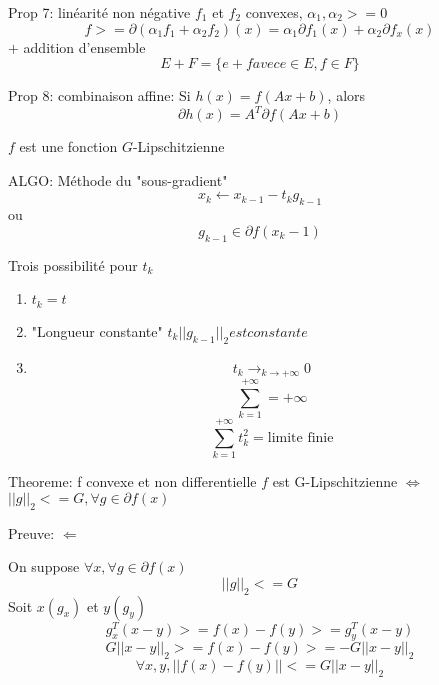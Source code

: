 \documentclass{article}
\begin{document}
Prop 7: lin\'earit\'e non n\'egative
$f_1$ et $f_2$ convexes, $\alpha_1,\alpha_2>=0$
\begin{equation}
f>=\partial(\alpha_1 f_1+\alpha_2 f_2)(x)=\alpha_1 \partial f_1(x)+\alpha_2 \partial f_x(x)
\end{equation}
$+$ addition d'ensemble
\begin{equation}
E+F=\{e+f avec e\in E,f\in F\}
\end{equation}

Prop 8: combinaison affine:
Si $h(x)=f(Ax+b)$, alors
\begin{equation}
\partial h(x)=A^T\partial f(Ax+b)
\end{equation}

$f$ est une fonction $G$-Lipschitzienne

ALGO: M\'ethode du "sous-gradient"
\begin{equation}
x_k\leftarrow x_{k-1}-t_k g_{k-1}
\end{equation}
ou
\begin{equation}
g_{k-1}\in\partial f(x_k-1)
\end{equation}

Trois possibilit\'e pour $t_k$
\begin{enumerate}
\item $t_k=t$
\item "Longueur constante" $t_k||g_{k-1}||_2 est constante$
\item 
\begin{equation}
t_k\to_{k\to +\infty} 0
\end{equation}
\begin{equation}
\sum_{k=1}^{+\infty}=+\infty
\end{equation}
\begin{equation}
\sum_{k=1}^{+\infty} t_k^2=\text{limite finie}
\end{equation}
\end{enumerate}

Theoreme: f convexe et non differentielle
$f$ est G-Lipschitzienne $\Leftrightarrow$ $||g||_2<=G,\forall g\in\partial f(x)$

Preuve:
$\Leftarrow$

On suppose $\forall x, \forall g\in\partial f(x)$
\begin{equation}
||g||_2<=G
\end{equation}
Soit $x(g_x)$ et $y(g_y)$
\begin{equation}
g_x^T(x-y)>=f(x)-f(y)>=g_y^T(x-y)
\end{equation}
\begin{equation}
G||x-y||_2>=f(x)-f(y)>=-G||x-y||_2
\end{equation}
\begin{equation}
\forall x,y, ||f(x)-f(y)||<=G||x-y||_2
\end{equation}
\end{document}
